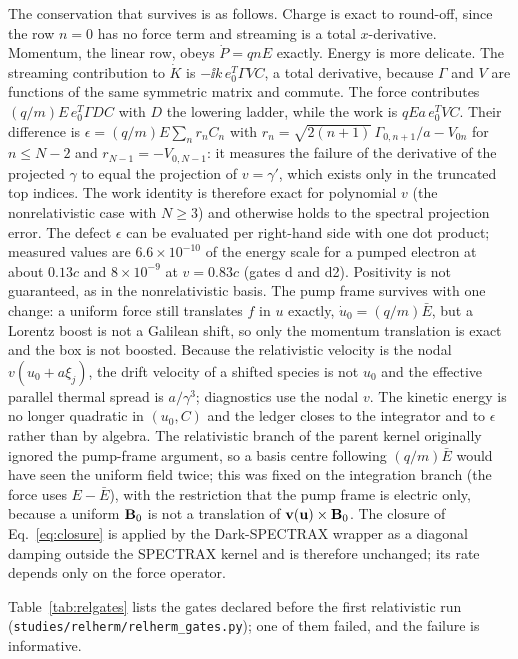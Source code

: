 The conservation that survives is as follows. Charge is exact to round-off, since the row $n=0$ has no force term and streaming is a total $x$-derivative. Momentum, the linear row, obeys $\dot P=qnE$ exactly. Energy is more delicate. The streaming contribution to $\dot K$ is $-\ii k\,e_0^T\Gamma VC$, a total derivative, because $\Gamma$ and $V$ are functions of the same symmetric matrix and commute. The force contributes $(q/m)E\,e_0^T\Gamma DC$ with $D$ the lowering ladder, while the work is $qEa\,e_0^TVC$. Their difference is $\epsilon=(q/m)E\sum_nr_nC_n$ with $r_n=\sqrt{2(n+1)}\,\Gamma_{0,n+1}/a-V_{0n}$ for $n\le N-2$ and $r_{N-1}=-V_{0,N-1}$: it measures the failure of the derivative of the projected $\gamma$ to equal the projection of $v=\gamma'$, which exists only in the truncated top indices. The work identity is therefore exact for polynomial $v$ (the nonrelativistic case with $N\ge3$) and otherwise holds to the spectral projection error. The defect $\epsilon$ can be evaluated per right-hand side with one dot product; measured values are $6.6\times10^{-10}$ of the energy scale for a pumped electron at about $0.13c$ and $8\times10^{-9}$ at $v=0.83c$ (gates d and d2). Positivity is not guaranteed, as in the nonrelativistic basis. The pump frame survives with one change: a uniform force still translates $f$ in $u$ exactly, $\dot u_0=(q/m)\bar E$, but a Lorentz boost is not a Galilean shift, so only the momentum translation is exact and the box is not boosted. Because the relativistic velocity is the nodal $v(u_0+a\xi_j)$, the drift velocity of a shifted species is not $u_0$ and the effective parallel thermal spread is $a/\gamma^3$; diagnostics use the nodal $v$. The kinetic energy is no longer quadratic in $(u_0,C)$ and the ledger closes to the integrator and to $\epsilon$ rather than by algebra. The relativistic branch of the parent kernel originally ignored the pump-frame argument, so a basis centre following $(q/m)\bar E$ would have seen the uniform field twice; this was fixed on the integration branch (the force uses $E-\bar E$), with the restriction that the pump frame is electric only, because a uniform $\mathbf{B}_0$ is not a translation of $\mathbf{v}(\mathbf u)\times\mathbf{B}_0$. The closure of Eq.~\eqref{eq:closure} is applied by the Dark-SPECTRAX wrapper as a diagonal damping outside the SPECTRAX kernel and is therefore unchanged; its rate depends only on the force operator.

Table~\ref{tab:relgates} lists the gates declared before the first relativistic run (\texttt{studies/relherm/}\allowbreak\texttt{relherm\_gates.py}); one of them failed, and the failure is informative.

